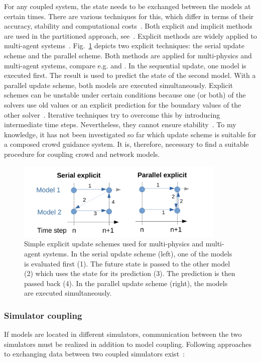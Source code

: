 For any coupled system, the state needs to be exchanged between the models at certain times. There are various techniques for this, which differ in terms of their accuracy, stability and computational costs~\cite[p.44]{gatzhammer-2014-cs}.
Both explicit and implicit methods are used in the partitioned approach, see~\cite{gatzhammer-2014-cs,lindner-2019-cs}. Explicit methods are widely applied to multi-agent systems~\cite{steinbrink-2018-cs}. Fig.~\ref{fig:couplescheme} depicts two explicit techniques: the serial update scheme and the parallel scheme. Both methods are applied for multi-physics and multi-agent systems, compare e.g. \cite{steinbrink-2018-cs} and \cite{lindner-2019-cs}. 
In the sequential update, one model is executed first. The result is used to predict the state of the second model.
With a parallel update scheme, both models are executed simultaneously. Explicit schemes can be unstable under certain conditions because one (or both) of the solvers use old values or an explicit prediction for the boundary values of the other solver~\cite[p.66]{gatzhammer-2014-cs}. Iterative techniques try to overcome this by introducing intermediate time steps.  
Nevertheless, they cannot ensure stability~\cite{gatzhammer-2014-cs}. 
To my knowledge, it has not been investigated so far which update scheme is suitable for a composed crowd guidance system. It is, therefore, necessary to find a suitable procedure for coupling crowd and network models.

\begin{figure}[hbt!]
\centering
\includegraphics[width=10cm]{../figures/state-of-the-art/coupling/sequential approaches.pdf} 
\caption{Simple explicit update schemes used for multi-physics and multi-agent systems. In the serial update scheme (left), one of the models is evaluated first (1). The future state is passed to the other model (2) which uses the state for its prediction (3). The prediction is then passed back (4). In the parallel update scheme (right), the models are executed simultaneously. }
\label{fig:couplescheme}
\end{figure}


\subsubsection{Simulator coupling}
If models are located in different simulators, communication between the two simulators must be realized in addition to model coupling. 
Following approaches to exchanging data between two coupled simulators exist~\cite{gatzhammer-2014-cs}:

